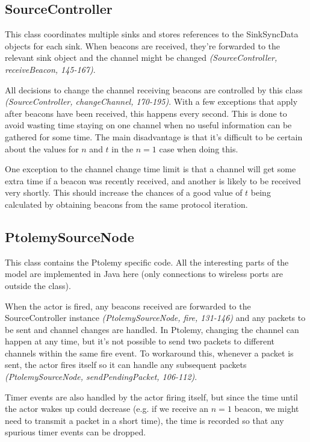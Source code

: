 \documentclass[a4paper,12pt,draft,DIV=calc]{scrartcl}
\newcommand{\coderef}[3]{\emph{(#1, #2, #3)}}
\begin{document}
\subsection{SourceController}
This class coordinates multiple sinks and stores references to the SinkSyncData
objects for each sink.  When beacons are received, they're forwarded to the
relevant sink object and the channel might be changed
\coderef{SourceController}{receiveBeacon}{145-167}.

All decisions to change the channel receiving beacons are controlled by this
class \coderef{SourceController}{changeChannel}{170-195}. With a few exceptions
that apply after beacons have been received, this happens every second. This is
done to avoid wasting time staying on one channel when no useful information
can be gathered for some time. The main disadvantage is that it's difficult to
be certain about the values for $n$ and $t$ in the $n = 1$ case when doing this.

One exception to the channel change time limit is that a channel will get some
extra time if a beacon was recently received, and another is likely to be
received very shortly. This should increase the chances of a good value of $t$
being calculated by obtaining beacons from the same protocol iteration.

\subsection{PtolemySourceNode}
This class contains the Ptolemy specific code. All the interesting parts of the
model are implemented in Java here (only connections to wireless ports are
outside the class).

When the actor is fired, any beacons received are forwarded to the
SourceController instance \coderef{PtolemySourceNode}{fire}{131-146} and any
packets to be sent and channel changes are handled. In Ptolemy, changing the
channel can happen at any time, but it's not possible to send two packets to
different channels within the same fire event. To workaround this, whenever a
packet is sent, the actor fires itself so it can handle any subsequent packets
\coderef{PtolemySourceNode}{sendPendingPacket}{106-112}.

Timer events are also handled by the actor firing itself, but since the time
until the actor wakes up could decrease (e.g. if we receive an $n = 1$ beacon,
we might need to transmit a packet in a short time), the time is recorded so
that any spurious timer events can be dropped.
\end{document}
